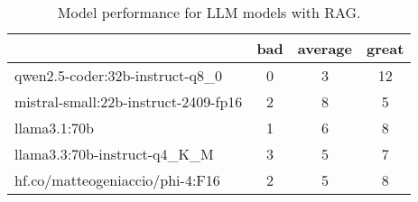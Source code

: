 \begin{table}[H]
\centering
\begin{tabular}[H]{|l|c|c|c|}
\toprule
 & bad & average & great \\
\midrule
qwen2.5-coder:32b-instruct-q8\_0 & 0 & 3 & 12 \\
mistral-small:22b-instruct-2409-fp16 & 2 & 8 & 5 \\
llama3.1:70b & 1 & 6 & 8 \\
llama3.3:70b-instruct-q4\_K\_M & 3 & 5 & 7 \\
hf.co/matteogeniaccio/phi-4:F16 & 2 & 5 & 8 \\
\bottomrule
\end{tabular}
\caption{Model performance for LLM models with RAG.}
\end{table}
